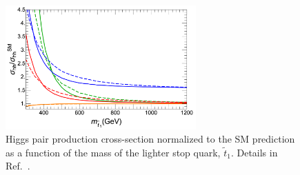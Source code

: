 \begin{figure}[!htb]
    \begin{center}
        \includegraphics[width=0.65\textwidth]{figures/higgs_corr/sigma_hh_stops}
        \caption{
            Higgs pair production cross-section normalized to the SM prediction as a function
            of the mass of the lighter stop quark, $\tilde{t}_1$.
            Details in Ref.~\cite{LightStopsHiggs}.
        }
        \label{fig:hh_sigma_stops}
    \end{center}
\end{figure}
